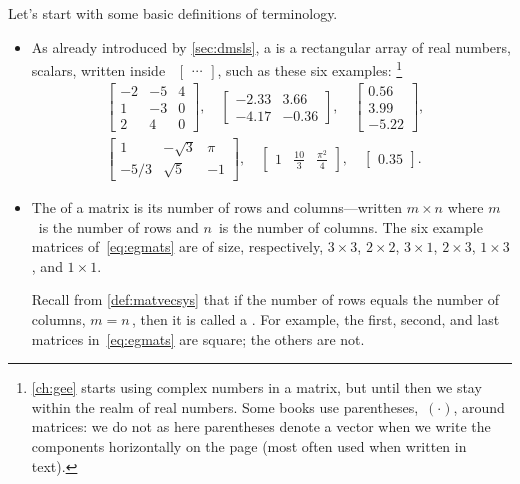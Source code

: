 Let's start with some basic definitions of terminology.
\begin{itemize}
\item As already introduced by \cref{sec:dmsls}, a  is a rectangular array of real numbers, scalars, written inside ~\(\begin{bmatrix} \cdots  \end{bmatrix}\), such as these six examples:%
\footnote{\cref{ch:gee} starts using complex numbers in a matrix, but until then we stay within the realm of real numbers.  Some books use parentheses,~\((\cdot)\), around matrices: we do not as here parentheses denote a vector when we write the components horizontally on the page (most often used when written in text).}
\begin{align}&
\begin{bmatrix}   -2 & -5 & 4
\\ 1 & -3 & 0
\\ 2 & 4 & 0 \end{bmatrix},\quad
\begin{bmatrix}   -2.33 & 3.66
\\ -4.17 & -0.36 \end{bmatrix},\quad
\begin{bmatrix}  0.56
\\ 3.99 
\\-5.22 \end{bmatrix},\quad
\nonumber\\&
\begin{bmatrix}   1 & -\sqrt3 & \pi
\\ -5/3 & \sqrt5 & -1 \end{bmatrix},\quad
\begin{bmatrix}    1 & \frac{10}3 & \frac{\pi^2}4 \end{bmatrix},\quad
\begin{bmatrix} 0.35 \end{bmatrix}.
\qquad\label{eq:egmats}
\end{align}


\item The  of a matrix is its number of rows and columns---written \(m\times n\) where \(m\)~is the number of rows and \(n\)~is the number of columns.
The six example matrices of~\eqref{eq:egmats} are of size, respectively, \(3\times 3\), \(2\times 2\), \(3\times 1\), \(2\times 3\), \(1\times 3\), and \(1\times 1\).

Recall from \cref{def:matvecsys} that if the number of rows equals the number of columns, \(m=n\)\,, then it is called a .
For example, the first, second, and last matrices in~\eqref{eq:egmats} are square; the others are not.


\end{itemize}
